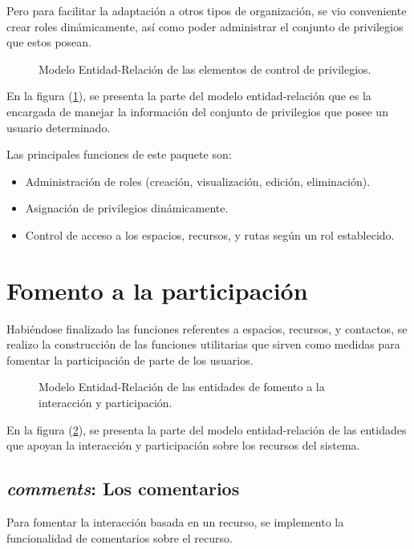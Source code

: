 Pero para facilitar la adaptación a otros tipos de organización, se vio
conveniente crear roles dinámicamente, así como poder administrar el conjunto
de privilegios que estos posean.

\begin{figure}
\centering

\caption{Modelo Entidad-Relación de las elementos de control de privilegios.}
\label{modelo6}
\end{figure}

En la figura (\ref{modelo6}), se presenta la parte del modelo entidad-relación
que es la encargada de manejar la información del conjunto de privilegios que
posee un usuario determinado.

Las principales funciones de este paquete son:

\begin{itemize}
\item Administración de roles (creación, visualización, edición, eliminación).
\item Asignación de privilegios dinámicamente.
\item Control de acceso a los espacios, recursos, y rutas según un rol
establecido.
\end{itemize}

\section{Fomento a la participación}
Habiéndose finalizado las funciones referentes a espacios, recursos, y
contactos, se realizo la construcción de las funciones utilitarias que sirven
como medidas para fomentar la participación de parte de los usuarios.

\begin{figure}
\centering

\caption{Modelo Entidad-Relación de las entidades de fomento a la interacción y
participación.}
\label{modelo7}
\end{figure}

En la figura (\ref{modelo7}), se presenta la parte del modelo entidad-relación
de las entidades que apoyan la interacción y participación sobre los recursos
del sistema.

\subsection{\emph{comments}: Los comentarios}
Para fomentar la interacción basada en un recurso, se implemento la
funcionalidad de comentarios sobre el recurso.

